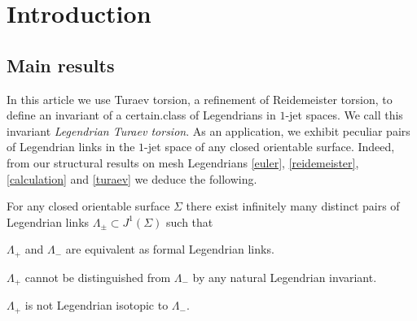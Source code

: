 \section{Introduction}\label{Section: introduction}

\subsection{Main results}\label{Subsection: main results}

In this article we use Turaev torsion, a refinement of Reidemeister torsion, to define an invariant of a certain.class of Legendrians in $1$-jet spaces. We call this invariant {\it Legendrian Turaev torsion}. As an application, we \hbox{exhibit} \hbox{peculiar} pairs of Legendrian links in the $1$-jet space of any closed orientable surface. Indeed, from our structural results on mesh Legendrians \ref{euler}, \ref{reidemeister}, \ref{calculation} and \ref{turaev} we deduce the following.

\begin{corollary}\label{corollarypairs}
For any closed orientable surface $\Sigma$ there exist infinitely many distinct pairs of Legendrian links $\Lambda_\pm \subset J^1(\Sigma)$ such that
\begin{enumeratea}
\item\label{corollarypairsa}
$\Lambda_+$ and $\Lambda_-$ are equivalent as formal Legendrian links.
\item\label{corollarypairsb}
$\Lambda_+$ cannot be distinguished from $\Lambda_-$ by any natural Legendrian invariant.
\item\label{corollarypairsc}
$\Lambda_+$ is not Legendrian isotopic to $\Lambda_-$.
\end{enumeratea}
\end{corollary}

